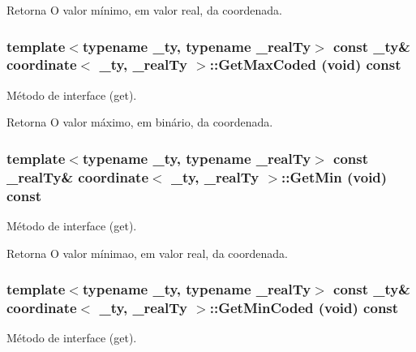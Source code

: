 \begin{DoxyReturn}{Retorna}
O valor mínimo, em valor real, da coordenada. 
\end{DoxyReturn}
\hypertarget{classcoordinate_a06ceabdaa759122e5ea2436a68da951b}{
\subsubsection[{GetMaxCoded}]{\setlength{\rightskip}{0pt plus 5cm}template$<$typename \_\-ty, typename \_\-realTy$>$ const \_\-ty\& {\bf coordinate}$<$ \_\-ty, \_\-realTy $>$::GetMaxCoded (void) const}}
\label{classcoordinate_a06ceabdaa759122e5ea2436a68da951b}
Método de interface (get).

\begin{DoxyReturn}{Retorna}
O valor máximo, em binário, da coordenada. 
\end{DoxyReturn}
\hypertarget{classcoordinate_ad3a0bad89d7914ec157f773f445edeeb}{
\subsubsection[{GetMin}]{\setlength{\rightskip}{0pt plus 5cm}template$<$typename \_\-ty, typename \_\-realTy$>$ const \_\-realTy\& {\bf coordinate}$<$ \_\-ty, \_\-realTy $>$::GetMin (void) const}}
\label{classcoordinate_ad3a0bad89d7914ec157f773f445edeeb}
Método de interface (get).

\begin{DoxyReturn}{Retorna}
O valor mínimao, em valor real, da coordenada. 
\end{DoxyReturn}
\hypertarget{classcoordinate_ae5cae8ad8f7c0cd26d4ac1e565c2b72b}{
\subsubsection[{GetMinCoded}]{\setlength{\rightskip}{0pt plus 5cm}template$<$typename \_\-ty, typename \_\-realTy$>$ const \_\-ty\& {\bf coordinate}$<$ \_\-ty, \_\-realTy $>$::GetMinCoded (void) const}}
\label{classcoordinate_ae5cae8ad8f7c0cd26d4ac1e565c2b72b}
Método de interface (get).

